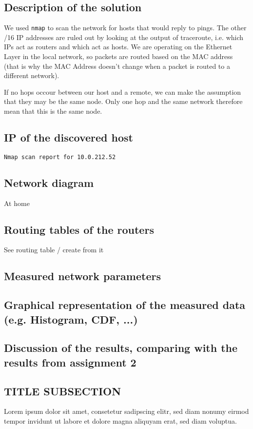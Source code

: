 \documentclass[parskip=full]{scrartcl}
\begin{document}
\subsection{Description of the solution}
We used \texttt{nmap} to scan the network for hosts that would reply to pings. 
The other /16 IP addresses are ruled out by looking at the output of traceroute, i.e. which IPs act as routers and which act as hosts.
We are operating on the Ethernet Layer in the local network, so packets are routed based on the MAC address (that is why the MAC Address doesn't change when a packet is routed to a different network).

If no hops occour between our host and a remote, we can make the assumption that they may be the same node.
Only one hop and the same network therefore mean that this is the same node.

\subsection{IP of the discovered host}
\begin{verbatim}
Nmap scan report for 10.0.212.52
\end{verbatim}
\subsection{Network diagram}
At home
\subsection{Routing tables of the routers}
See routing table / create from it
\subsection{Measured network parameters}
\subsection{Graphical representation of the measured data (e.g. Histogram, CDF, ...)}
\subsection{Discussion of the results, comparing with the results from assignment 2}

\subsection{TITLE SUBSECTION}
Lorem ipsum dolor sit amet, consetetur sadipscing elitr, sed diam nonumy eirmod tempor invidunt ut labore et dolore magna aliquyam erat, sed diam voluptua.
\end{document}
